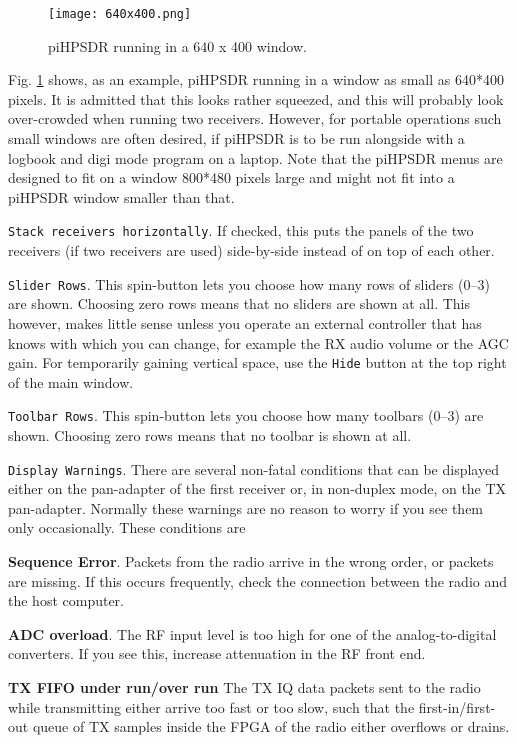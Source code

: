 \documentclass[12pt]{book}
\def\rett#1{\texttt{\color{red}#1}}
\def\pH{pi\-HPSDR\xspace}
\begin{document}
\begin{figure}[ht!]
\center
\texttt{[image: 640x400.png]}
\caption{\pH running in a 640 x 400 window.}
\label{fig:640x400}
\end{figure}

Fig. \ref{fig:640x400} shows, as an example, \pH running in a window as small
as 640*400 pixels. It is admitted that this looks rather squeezed, and this
will probably look over-crowded when running two receivers. However, for
portable operations such small windows are often desired,
if \pH is to be run alongside with a logbook and digi mode program on a laptop.
Note that the \pH menus are designed to fit on a window 800*480 pixels large and might
not fit into a \pH window smaller than that.

\rett{Stack receivers horizontally}. If checked, this puts the panels
of the two receivers (if two receivers are used) side-by-side instead of on top
of each other.

\rett{Slider Rows}. This spin-button lets you choose how many rows of sliders
(0--3) are shown. Choosing zero rows means that no sliders are shown at all.
This however, makes little sense unless you
operate an external controller that has knows with which you can
change, for example the RX audio volume or the AGC gain.
For temporarily gaining vertical space,
use the \rett{Hide} button at the top right of the main window.

\rett{Toolbar Rows}. This spin-button lets you choose how many toolbars
(0--3) are shown. Choosing zero rows means that no toolbar is shown at all.

\rett{Display Warnings}. There are several non-fatal conditions that can
be displayed either on the pan-adapter of the first receiver or, in non-duplex
mode, on the TX pan-adapter. Normally these warnings are no reason to worry
if you see them  only occasionally. These conditions are

\textbf{Sequence Error}. Packets from the radio arrive in the wrong order, or packets
are missing. If this occurs frequently, check the connection between the radio and
the host computer.

\textbf{ADC overload}. The RF input level is too high for one of the analog-to-digital
converters. If you see this, increase attenuation in the RF front end.

\textbf{TX FIFO under run/over run} The TX IQ data packets sent to the radio while transmitting
either arrive too fast or too slow, such that the first-in/first-out queue of TX samples
inside the FPGA of the radio either overflows or drains.
\end{document}
